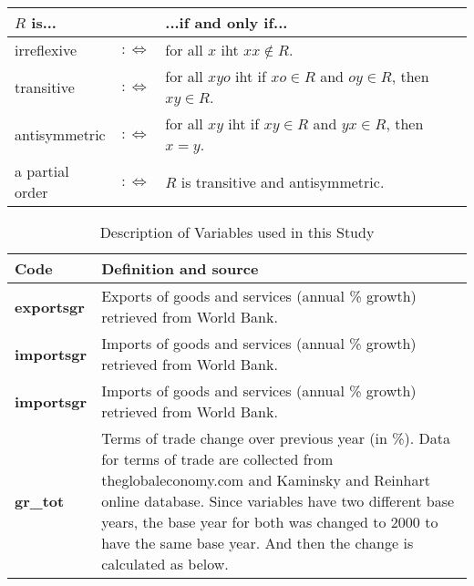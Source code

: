 \begin{tabular}{l c p{.5\textwidth}}

\toprule
$R$ is...       &                  & ...if and only if... \\
\midrule
irreflexive     &$:\Leftrightarrow$& for all $x$ iht $xx \notin R$. \\
transitive      &$:\Leftrightarrow$& for all $xyo$ iht if $xo \in R$ and $oy \in R$, then $xy \in R$. \\
antisymmetric   &$:\Leftrightarrow$& for all $xy$ iht if $xy \in R$ and $yx \in R$, then $x=y$. \\
a partial order &$:\Leftrightarrow$& $R$ is transitive and antisymmetric. \\
\bottomrule
\end{tabular}



\begin{xltabular}{\linewidth}{ l  X }
    \caption{Description of Variables used in this Study} 
    \endlastfoot 
    \hline
    \textbf{\normalsize Code} & \textbf{\normalsize Definition and source}  \\
    \hline
    
    \endhead
    
    \textbf{exportsgr} & Exports of goods and services (annual \% growth) retrieved from World Bank. \\ \hline 
    
    \textbf{importsgr} & Imports of goods and services (annual \% growth) retrieved from World Bank.\\ \hline 
    
    \textbf{importsgr} & Imports of goods and services (annual \% growth) retrieved from World Bank.\\ \hline 
    
    \textbf{gr\_tot} & Terms of trade change over previous year (in \%).  Data for terms of trade are collected from theglobaleconomy.com  and Kaminsky and Reinhart online database. Since variables have two different base years, the base year for both was changed to 2000 to have the same base year. And then the change is calculated as below. \\
    \hline

\end{xltabular}
